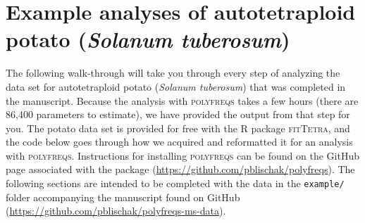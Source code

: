 \documentclass[]{article}
\title{}
\author{}
\date{}
\begin{document}
\maketitle


\section{\texorpdfstring{Example analyses of autotetraploid potato
(\emph{Solanum
tuberosum})}{Example analyses of autotetraploid potato (Solanum tuberosum)}}\label{example-analyses-of-autotetraploid-potato-solanum-tuberosum}

The following walk-through will take you through every step of analyzing
the data set for autotetraploid potato (\emph{Solanum tuberosum}) that
was completed in the manuscript. Because the analysis with
\textsc{polyfreqs} takes a few hours (there are 86,400 parameters to
estimate), we have provided the output from that step for you. The
potato data set is provided for free with the R package
\textsc{fitTetra}, and the code below goes through how we acquired and
reformatted it for an analysis with \textsc{polyfreqs}. Instructions for
installing \textsc{polyfreqs} can be found on the GitHub page associated
with the package (\url{https://github.com/pblischak/polyfreqs}). The
following sections are intended to be completed with the data in the
\texttt{example/} folder accompanying the manuscript found on GitHub
(\url{https://github.com/pblischak/polyfreqs-ms-data}).
\end{document}
